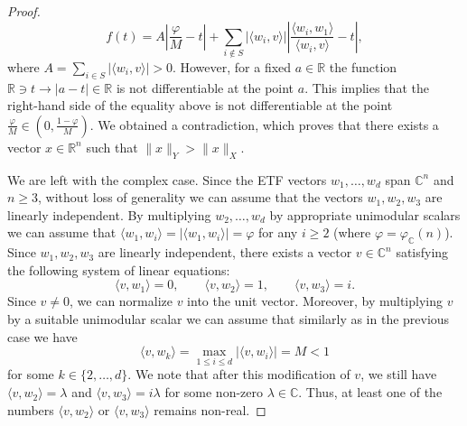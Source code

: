 \documentclass[12pt, reqno]{amsart}
\theoremstyle{definition}
\theoremstyle{remark}
\numberwithin{equation}{section}
\begin{document}
\begin{proof}
\begin{equation}
\label{derivative}
f(t) = A\left | \frac{\varphi}{M} - t \right | + \sum_{i \not \in S} |\langle w_i, v \rangle | \left |\frac{\langle w_i, w_1 \rangle}{\langle w_i, v \rangle } - t \right |,
\end{equation}
where $A = \sum_{i \in S} |\langle w_i, v \rangle | > 0 $. However, for a fixed $a \in \mathbb{R}$ the function $\mathbb{R} \ni t \to |a-t| \in \mathbb{R}$ is not differentiable at the point $a$. This implies that the right-hand side of the equality above is not differentiable at the point $\frac{\varphi}{M} \in \left (0, \frac{1-\varphi}{M} \right )$.  We obtained a contradiction, which proves that there exists a vector $x \in \mathbb{R}^n$ such that $\|x \|_Y > \|x \|_X$.




We are left with the complex case. Since the ETF vectors $w_1, \ldots, w_d$ span $\mathbb{C}^n$ and $n \geq 3$, without loss of generality we can assume that the vectors $w_1, w_2, w_3$ are linearly independent. By multiplying $w_2, \ldots, w_d$ by appropriate unimodular scalars we can assume that $\langle w_1, w_i \rangle = |\langle w_1, w_i \rangle | = \varphi$ for any $i \geq 2$ (where $\varphi=\varphi_{\mathbb{C}}(n)$). Since $w_1, w_2, w_3$ are linearly independent, there exists a vector $v \in \mathbb{C}^n$ satisfying the following system of linear equations:
$$\langle v, w_1 \rangle=0, \qquad \langle v, w_2 \rangle = 1, \qquad \langle v, w_3 \rangle = i.$$
Since $v \neq 0$, we can normalize $v$ into the unit vector. Moreover, by multiplying $v$ by a suitable unimodular scalar we can assume that similarly as in the previous case we have 
$$\langle v, w_k \rangle = \max_{1 \leq i \leq d} | \langle v, w_i \rangle | = M < 1$$ for some $k \in \{2, \ldots, d\}$. We note that after this modification of $v$, we still have $\langle v, w_2 \rangle = \lambda$ and $\langle v, w_3 \rangle = i \lambda$ for some non-zero $\lambda \in \mathbb{C}$. Thus, at least one of the numbers $\langle v, w_2 \rangle$ or $\langle v, w_3 \rangle$ remains non-real.


\end{proof}
\end{document}
